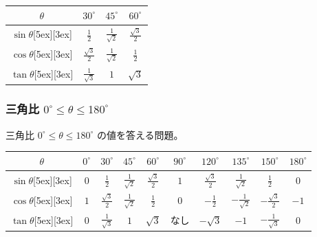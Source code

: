 \documentclass[b5paper,10pt]{ltjsreport}
\newcounter{drillnum}
\newcommand{\resetdrill}{\setcounter{drillnum}{0}} %
\newcommand{\drilltitle}{問題項目}
\newcommand{\includedrill}[2]{ %
  \renewcommand{\drilltitle}{#1} %
  \pagestyle{drillstyle}
  
  \resetdrill
  \pagestyle{explanationstyle}
  \thispagestyle{explanationstyle}
}
\begin{document}
\begin{center}
\begin{tabular}{|c||c|c|c|}
 \hline
 $\theta$ & $30^{\circ}$ & $45^{\circ}$ & $60^{\circ}$\\
 \hline \hline
 $\sin{\theta}$\raisebox{0ex}[5ex][3ex]{} & $\displaystyle \frac{1}{2}$ & $\displaystyle \frac{1}{\sqrt{2}}$ & $\displaystyle \frac{\sqrt{3}}{2}$\\
 \hline
 $\cos{\theta}$\raisebox{0ex}[5ex][3ex]{} & $\displaystyle \frac{\sqrt{3}}{2}$ & $\displaystyle \frac{1}{\sqrt{2}}$ & $\displaystyle \frac{1}{2}$\\
 \hline
 $\tan{\theta}$\raisebox{0ex}[5ex][3ex]{} & $\displaystyle \frac{1}{\sqrt{3}}$ & $1$ & $\displaystyle \sqrt{3}$\\
\hline
\end{tabular}
\end{center}

\vfil

\includedrill{三角比$0^{\circ}<\theta<90^{\circ}$}{code/triangle_function_0-90}



\subsubsection{三角比 $0^{\circ}\leq \theta \leq 180^{\circ}$}

三角比
$0^{\circ}\leq \theta \leq 180^{\circ}$
の値を答える問題。


\vfil

\begin{center}
\begin{tabular}{|c||c|c|c|c|c|c|c|c|c|}
 \hline
 $\theta$ & $0^{\circ}$ & $30^{\circ}$ & $45^{\circ}$ & $60^{\circ}$ & $90^{\circ}$ & $120^{\circ}$ & $135^{\circ}$ & $150^{\circ}$ & $180^{\circ}$ \\
 \hline \hline
 $\sin{\theta}$\raisebox{0ex}[5ex][3ex]{} & $0$ & $\displaystyle \frac{1}{2}$ & $\displaystyle \frac{1}{\sqrt{2}}$ & $\displaystyle \frac{\sqrt{3}}{2}$ & $1$ & $\displaystyle \frac{\sqrt{3}}{2}$ & $\displaystyle \frac{1}{\sqrt{2}}$ & $\displaystyle \frac{1}{2}$ & $0$ \\
 \hline
 $\cos{\theta}$\raisebox{0ex}[5ex][3ex]{} & $1$ & $\displaystyle \frac{\sqrt{3}}{2}$ & $\displaystyle \frac{1}{\sqrt{2}}$ & $\displaystyle \frac{1}{2}$ & $0$ & $\displaystyle -\frac{1}{2}$ & $\displaystyle -\frac{1}{\sqrt{2}}$ & $\displaystyle -\frac{\sqrt{3}}{2}$ & $-1$ \\
 \hline
 $\tan{\theta}$\raisebox{0ex}[5ex][3ex]{} & $0$ & $\displaystyle \frac{1}{\sqrt{3}}$ & $1$ & $\displaystyle \sqrt{3}$ & なし & $\displaystyle -\sqrt{3}$ & $-1$ & $\displaystyle -\frac{1}{\sqrt{3}}$ & $0$ \\
 \hline
\end{tabular}
\end{center}
\end{document}
